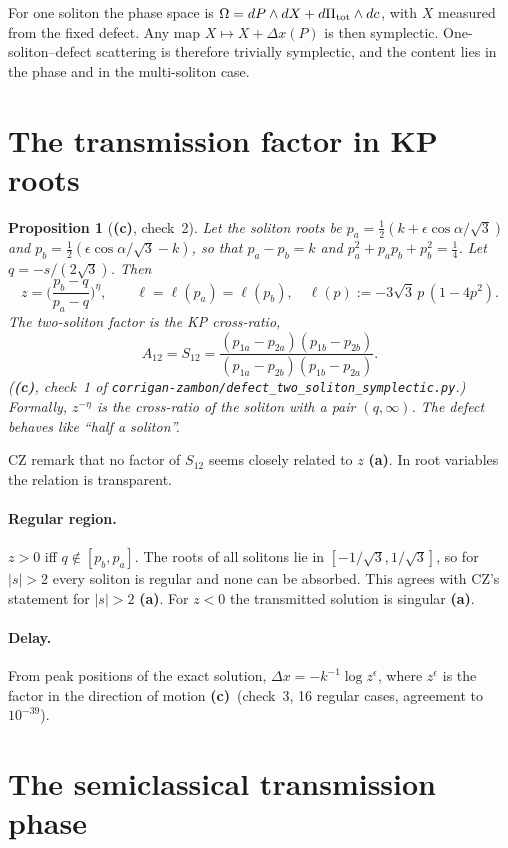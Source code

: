 \documentclass[11pt,a4paper]{article}
\newcommand{\La}{\textsf{\textbf{(a)}}}\newcommand{\Lb}{\textsf{\textbf{(b)}}}
\newcommand{\Lc}{\textsf{\textbf{(c)}}}\newcommand{\Ld}{\textsf{\textbf{(d)}}}
\newcommand{\script}[1]{\texttt{corrigan-zambon/#1}}
\newtheorem{proposition}{Proposition}\theoremstyle{remark}\newtheorem{remark}{Remark}
\begin{document}
For one soliton the phase space is $\Omega=dP\wedge dX+d\Pi_{\rm tot}\wedge dc$, with $X$ measured from the fixed defect. Any map $X\mapsto X+\Delta x(P)$ is then symplectic. One-soliton--defect scattering is therefore trivially symplectic, and the content lies in the phase and in the multi-soliton case.

\section{The transmission factor in KP roots}

\begin{proposition}[\Lc, check~2]\label{prop:z}
Let the soliton roots be $p_a=\tfrac12(k+\epsilon\cos\alpha/\sqrt3)$ and $p_b=\tfrac12(\epsilon\cos\alpha/\sqrt3-k)$, so that $p_a-p_b=k$ and $p_a^2+p_ap_b+p_b^2=\tfrac14$. Let $q=-s/(2\sqrt3)$. Then
\[
z=\Big(\frac{p_b-q}{p_a-q}\Big)^{\eta},\qquad
\ell=\ell(p_a)=\ell(p_b),\quad \ell(p):=-3\sqrt3\,p\,(1-4p^2).
\]
The two-soliton factor is the KP cross-ratio,
\[
A_{12}=S_{12}=\frac{(p_{1a}-p_{2a})(p_{1b}-p_{2b})}{(p_{1a}-p_{2b})(p_{1b}-p_{2a})} .
\]
(\Lc, check~1 of \script{defect\_two\_soliton\_symplectic.py}.) Formally, $z^{-\eta}$ is the cross-ratio of the soliton with a pair $(q,\infty)$. The defect behaves like ``half a soliton''.
\end{proposition}

CZ remark that no factor of $S_{12}$ seems closely related to $z$ \La. In root variables the relation is transparent.

\paragraph{Regular region.} $z>0$ iff $q\notin[p_b,p_a]$. The roots of all solitons lie in $[-1/\sqrt3,1/\sqrt3]$, so for $|s|>2$ every soliton is regular and none can be absorbed. This agrees with CZ's statement for $|s|>2$ \La. For $z<0$ the transmitted solution is singular \La.

\paragraph{Delay.} From peak positions of the exact solution, $\Delta x=-k^{-1}\log z^{\epsilon}$, where $z^\epsilon$ is the factor in the direction of motion \Lc\ (check~3, 16 regular cases, agreement to $10^{-39}$).

\section{The semiclassical transmission phase}
\end{document}
